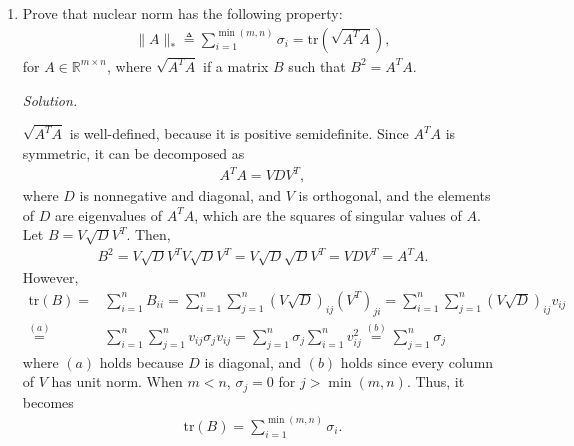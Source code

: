 \documentclass{article}
\begin{document}
\begin{enumerate}
\item Prove that nuclear norm has the following property:
	\begin{align*}
	\|A\|_*\triangleq \sum_{i=1}^{\min(m,n)} \sigma_i=\text{tr}(\sqrt{A^TA}),	
	\end{align*}
for $A\in\mathbb{R}^{m\times n}$, where $\sqrt{A^TA}$ if a matrix $B$ such that $B^2=A^TA$.

\emph{Solution.}

$\sqrt{A^TA}$ is well-defined, because it is positive semidefinite.
Since $A^TA$ is symmetric, it can be decomposed as
	\begin{align*}
	A^TA=VDV^T,	
	\end{align*}
where $D$ is nonnegative and diagonal, and $V$ is orthogonal, and the elements of $D$ are eigenvalues of $A^TA$, which are the squares of singular values of $A$.
Let $B=V\sqrt{D}V^T$. Then,
	\begin{align*}
	B^2=V\sqrt{D}V^TV\sqrt{D}V^T=V\sqrt{D} \sqrt{D}V^T=VDV^T=A^TA.	
	\end{align*}
However,
	\begin{align*}
	\text{tr}(B)=&	\sum_{i=1}^n B_{ii}=\sum_{i=1}^n \sum_{j=1}^n \left(V\sqrt{D}\right)_{ij}\left(V^T\right)_{ji}=\sum_{i=1}^n \sum_{j=1}^n \left(V\sqrt{D}\right)_{ij}v_{ij}\\
	\stackrel{(a)}{=}&\sum_{i=1}^n \sum_{j=1}^n v_{ij} \sigma_j v_{ij}=\sum_{j=1}^n \sigma_j\sum_{i=1}^n v_{ij}^2\stackrel{(b)}{=}\sum_{j=1}^n \sigma_j
	\end{align*}
where $(a)$ holds because $D$ is diagonal, and  $(b)$ holds since every column of $V$ has unit norm.
When $m<n$, $\sigma_j=0$ for $j>\min(m,n)$. Thus, it becomes
	\begin{align*}
	\text{tr}(B)=	\sum_{i=1}^{\min(m,n)} \sigma_i.
	\end{align*}





\end{enumerate}
\end{document}
